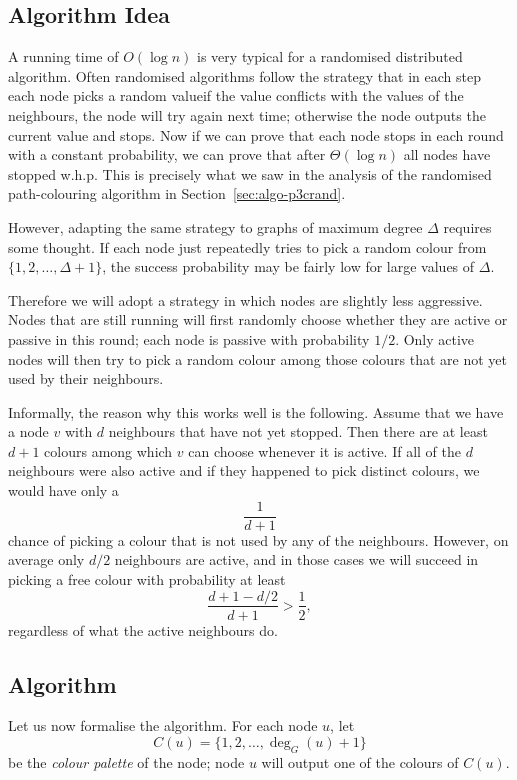 \subsection{Algorithm Idea}

A running time of $O(\log n)$ is very typical for a randomised distributed algorithm. Often randomised algorithms follow the strategy that in each step each node picks a random value\mydash if the value conflicts with the values of the neighbours, the node will try again next time; otherwise the node outputs the current value and stops. Now if we can prove that each node stops in each round with a constant probability, we can prove that after $\Theta(\log n)$ all nodes have stopped w.h.p. This is precisely what we saw in the analysis of the randomised path-colouring algorithm in Section~\ref{sec:algo-p3crand}.

However, adapting the same strategy to graphs of maximum degree $\Delta$ requires some thought. If each node just repeatedly tries to pick a random colour from $\{1,2,\dotsc,\Delta+1\}$, the success probability may be fairly low for large values of $\Delta$.

Therefore we will adopt a strategy in which nodes are slightly less aggressive. Nodes that are still running will first randomly choose whether they are active or passive in this round; each node is passive with probability $1/2$. Only active nodes will then try to pick a random colour among those colours that are not yet used by their neighbours.

Informally, the reason why this works well is the following. Assume that we have a node $v$ with $d$ neighbours that have not yet stopped. Then there are at least $d+1$ colours among which $v$ can choose whenever it is active. If all of the $d$ neighbours were also active and if they happened to pick distinct colours, we would have only a \[\frac{1}{d+1}\] chance of picking a colour that is not used by any of the neighbours. However, on average only $d/2$ neighbours are active, and in those cases we will succeed in picking a free colour with probability at least \[\frac{d+1 - d/2}{d+1} > \frac{1}{2},\] regardless of what the active neighbours do.


\subsection{Algorithm}

Let us now formalise the algorithm. For each node $u$, let
\[
    C(u) = \{1,2,\dotsc,\deg_G(u)+1\}
\]
be the \emph{colour palette} of the node; node $u$ will output one of the colours of $C(u)$. 

